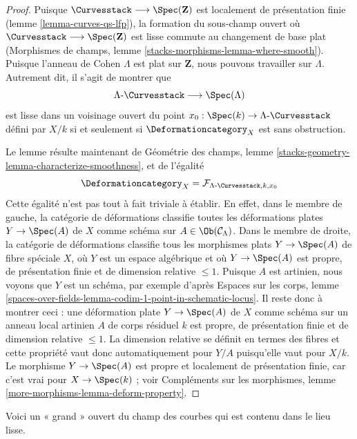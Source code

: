 \begin{proof}
Puisque $\Curvesstack \longrightarrow \Spec(\mathbf{Z})$ est localement
de présentation finie (lemme \ref{lemma-curves-qs-lfp}),
la formation du sous-champ ouvert où
$\Curvesstack \longrightarrow \Spec(\mathbf{Z})$ est lisse commute au changement de base
plat
(Morphismes de champs, lemme \ref{stacks-morphisms-lemma-where-smooth}).
Puisque l'anneau de Cohen $\Lambda$ est plat sur $\mathbf{Z}$,
nous pouvons travailler sur $\Lambda$. Autrement dit, il s'agit de montrer que
$$
\Lambda\text{-}\Curvesstack \longrightarrow \Spec(\Lambda)
$$
est lisse dans un voisinage ouvert du point
$x_0 : \Spec(k) \to \Lambda\text{-}\Curvesstack$
défini par $X/k$ si et seulement si $\Deformationcategory_X$ est sans obstruction.

\medskip\noindent
Le lemme résulte maintenant de
Géométrie des champs, lemme \ref{stacks-geometry-lemma-characterize-smoothness},
et de l'égalité
$$
\Deformationcategory_X =
\mathcal{F}_{\Lambda\text{-}\Curvesstack, k, x_0}
$$
Cette égalité n'est pas tout à fait triviale à établir. En effet, dans le
membre de gauche, la catégorie de déformations classifie toutes les déformations plates
$Y \to \Spec(A)$ de $X$ comme schéma sur $A \in \Ob(\mathcal{C}_\Lambda)$.
Dans le membre de droite, la catégorie de déformations classifie tous les
morphismes plats $Y \to \Spec(A)$ de fibre spéciale $X$,
où $Y$ est un espace algébrique et où
$Y \to \Spec(A)$ est propre, de présentation finie et de
dimension relative $\leq 1$. Puisque $A$ est artinien, nous voyons
que $Y$ est un schéma, par exemple d'après Espaces sur les corps, lemme
\ref{spaces-over-fields-lemma-codim-1-point-in-schematic-locus}.
Il reste donc à montrer ceci : une déformation plate $Y \to \Spec(A)$ de
$X$ comme schéma sur un anneau local artinien $A$ de corps résiduel $k$
est propre, de présentation finie et de dimension relative $\leq 1$.
La dimension relative se définit en termes des fibres et cette propriété vaut donc
automatiquement pour $Y/A$ puisqu'elle vaut pour $X/k$.
Le morphisme $Y \to \Spec(A)$ est propre et localement de présentation finie,
car c'est vrai pour $X \to \Spec(k)$ ; voir
Compléments sur les morphismes, lemme \ref{more-morphisms-lemma-deform-property}.
\end{proof}

\noindent
Voici un « grand » ouvert du champ des courbes qui est contenu
dans le lieu lisse.


